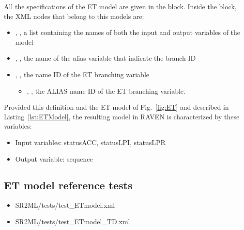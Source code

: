 All the specifications of the ET model are given in the
 block.
Inside the  block, the XML
nodes that belong to this models are:
\begin{itemize}
  \item  {}, , a list containing the names of both the input and output variables of the model
  \item  {}, , the name of the alias variable that indicate the branch ID
  \item  {}, , the name ID of the ET branching variable
	  \begin{itemize}
	    \item {}, , the ALIAS name ID of the ET branching variable.
	  \end{itemize}
\end{itemize}

Provided this definition and the ET model of Fig.~\ref{fig:ET} and described in Listing~\ref{lst:ETModel},
the resulting model in RAVEN is characterized by these variables:
\begin{itemize}
	\item Input variables: statusACC, statusLPI, statusLPR
	\item Output variable: sequence
\end{itemize}

\subsection{ET model reference tests}
\begin{itemize}
	\item SR2ML/tests/test\_ETmodel.xml
	\item SR2ML/tests/test\_ETmodel\_TD.xml
\end{itemize}
